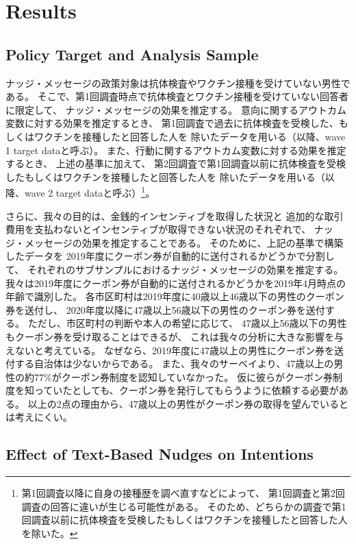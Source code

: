 \documentclass[
  11pt,
  a4paper,
]{article}
\begin{document}
\hypertarget{result}{%
\section{Results}\label{result}}

\hypertarget{sample}{%
\subsection{Policy Target and Analysis Sample}\label{sample}}

ナッジ・メッセージの政策対象は抗体検査やワクチン接種を受けていない男性である。
そこで、第1回調査時点で抗体検査とワクチン接種を受けていない回答者に限定して、
ナッジ・メッセージの効果を推定する。
意向に関するアウトカム変数に対する効果を推定するとき、
第1回調査で過去に抗体検査を受検した、もしくはワクチンを接種したと回答した人を
除いたデータを用いる（以降、wave 1 target dataと呼ぶ）。
また、行動に関するアウトカム変数に対する効果を推定するとき、
上述の基準に加えて、
第2回調査で第1回調査以前に抗体検査を受検したもしくはワクチンを接種したと回答した人を
除いたデータを用いる（以降、wave 2 target dataと呼ぶ）\footnote{第1回調査以降に自身の接種歴を調べ直すなどによって、
  第1回調査と第2回調査の回答に違いが生じる可能性がある。
  そのため、どちらかの調査で第1回調査以前に抗体検査を受検したもしくはワクチンを接種したと回答した人を除いた。}。

さらに、我々の目的は、金銭的インセンティブを取得した状況と
追加的な取引費用を支払わないとインセンティブが取得できない状況のそれぞれで、
ナッジ・メッセージの効果を推定することである。
そのために、上記の基準で構築したデータを
2019年度にクーポン券が自動的に送付されるかどうかで分割して、
それぞれのサブサンプルにおけるナッジ・メッセージの効果を推定する。
我々は2019年度にクーポン券が自動的に送付されるかどうかを2019年4月時点の年齢で識別した。
各市区町村は2019年度に40歳以上46歳以下の男性のクーポン券を送付し、
2020年度以降に47歳以上56歳以下の男性のクーポン券を送付する。
ただし、市区町村の判断や本人の希望に応じて、
47歳以上56歳以下の男性もクーポン券を受け取ることはできるが、
これは我々の分析に大きな影響を与えないと考えている。
なぜなら、2019年度に47歳以上の男性にクーポン券を送付する自治体は少ないからである。
また、我々のサーベイより、47歳以上の男性の約77\%がクーポン券制度を認知していなかった。
仮に彼らがクーポン券制度を知っていたとしても、クーポン券を発行してもらうように依頼する必要がある。
以上の2点の理由から、47歳以上の男性がクーポン券の取得を望んでいるとは考えにくい。

\hypertarget{intention}{%
\subsection{Effect of Text-Based Nudges on Intentions}\label{intention}}
\end{document}
